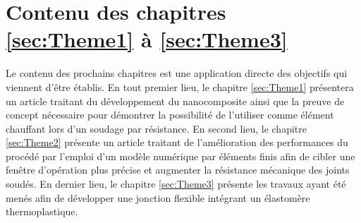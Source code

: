 \section{Contenu des chapitres \ref{sec:Theme1} à \ref{sec:Theme3}}

Le contenu des prochains chapitres est une application directe des objectifs qui viennent d'être établis. 
En tout premier lieu, le chapitre \ref{sec:Theme1} présentera un article traitant du développement du nanocomposite ainsi que la preuve de concept nécessaire pour démontrer la possibilité de l'utiliser comme élément chauffant lors d'un soudage par résistance. 
En second lieu, le chapitre \ref{sec:Theme2} présente un article traitant de l'amélioration des performances du procédé par l'emploi d'un modèle numérique par éléments finis afin de cibler une fenêtre d'opération plus précise et augmenter la résistance mécanique des joints soudés. 
En dernier lieu, le chapitre \ref{sec:Theme3} présente les travaux ayant été menés afin de développer une jonction flexible intégrant un élastomère thermoplastique. 